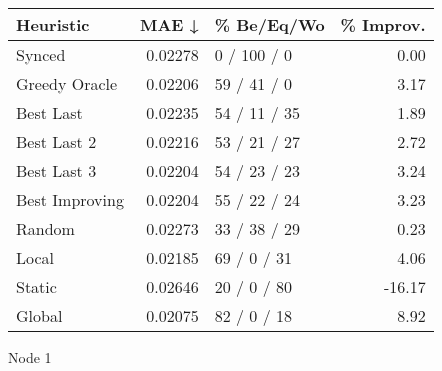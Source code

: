 \begin{tabular}{lrlr}
\toprule
\textbf{Heuristic} & \textbf{MAE ↓} & \textbf{\% Be/Eq/Wo} & \textbf{\% Improv.} \\
\midrule
            Synced &        0.02278 &          0 / 100 / 0 &                0.00 \\
     Greedy Oracle &        0.02206 &          59 / 41 / 0 &                3.17 \\
         Best Last &        0.02235 &         54 / 11 / 35 &                1.89 \\
       Best Last 2 &        0.02216 &         53 / 21 / 27 &                2.72 \\
       Best Last 3 &        0.02204 &         54 / 23 / 23 &                3.24 \\
    Best Improving &        0.02204 &         55 / 22 / 24 &                3.23 \\
            Random &        0.02273 &         33 / 38 / 29 &                0.23 \\
             Local &        0.02185 &          69 / 0 / 31 &                4.06 \\
            Static &        0.02646 &          20 / 0 / 80 &              -16.17 \\
            Global &        0.02075 &          82 / 0 / 18 &                8.92 \\
\bottomrule
\end{tabular}
\caption{Node 1}
\label{tab:iid_lr01_le1_bs4_1}
